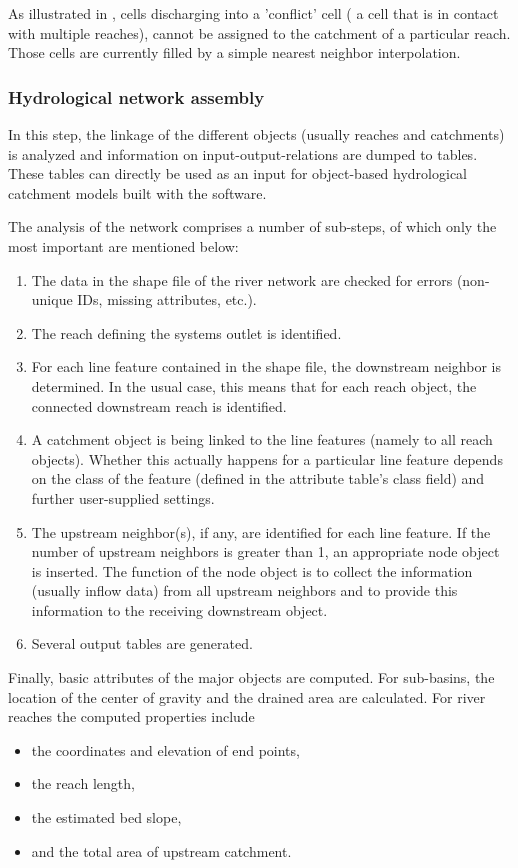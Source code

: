 As illustrated in , cells discharging into a 'conflict' cell (\ie{} a cell that is in contact with multiple reaches), cannot be assigned to the catchment of a particular reach. Those cells are currently filled by a simple nearest neighbor interpolation.

\subsubsection*{Hydrological network assembly}
In this step, the linkage of the different objects (usually reaches and catchments) is analyzed and information on input-output-relations are dumped to tables. These tables can directly be used as an input for object-based hydrological catchment models built with the  software.

The analysis of the network comprises a number of sub-steps, of which only the most important are mentioned below:

\begin{enumerate}
  \item The data in the shape file of the river network are checked for errors (non-unique IDs, missing attributes, etc.).
  \item The reach defining the systems outlet is identified.
  \item For each line feature contained in the shape file, the downstream neighbor is determined. In the usual case, this means that for each reach object, the connected downstream reach is identified.
  \item A catchment object is being linked to the line features (namely to all reach objects). Whether this actually happens for a particular line feature depends on the class of the feature (defined in the attribute table's class field) and further user-supplied settings.
  \item The upstream neighbor(s), if any, are identified for each line feature. If the number of upstream neighbors is greater than 1, an appropriate node object is inserted. The function of the node object is to collect the information (usually inflow data) from all upstream neighbors and to provide this information to the receiving downstream object.
  \item Several output tables are generated.
\end{enumerate}

Finally, basic attributes of the major objects are computed. For sub-basins, the location of the center of gravity and the drained area are calculated. For river reaches the computed properties include
\begin{itemize}
  \item the coordinates and elevation of end points,
  \item the reach length,
  \item the estimated bed slope,
  \item and the total area of upstream catchment.
\end{itemize}

